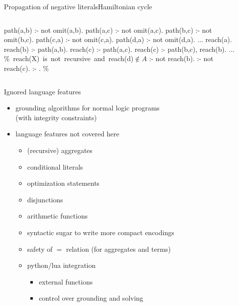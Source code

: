 \begin{frame}{Propagation of negative literals}{Hamiltonian cycle}
  \begin{columns}
    \begin{column}{0.45\textwidth}
    \begin{minipage}{.4\textwidth}\small
      \begin{semiverbatim}
path(a,b) :- not omit(a,b).
path(a,c) :- not omit(a,c).
path(b,c) :- not omit(b,c).
path(c,a) :- not omit(c,a).
path(d,a) :- not omit(d,a).
...
\alert{reach(a)}.
\alert{reach(b)} :- path(a,b).
\alert{reach(c)} :- path(a,c).
\alert{reach(c)} :- path(b,c), reach(b).
...
\mbox{{\color{comment}\% reach(X) is not recursive and reach(d)\({}\not\in{}A\)}}
:- not reach(b).
:- not reach(c).
:- . \color{comment}\% 
      \end{semiverbatim}
    \end{minipage}
    \end{column}
    \begin{column}[t]{0.45\textwidth}
      \centering
      \Graph[draw=none]
    \end{column}
  \end{columns}
\end{frame}
\begin{frame}{Ignored language features}
  \bigskip
  \begin{itemize}
    \item grounding algorithms for normal logic programs\\(with integrity constraints)
    \item language features not covered here
      \begin{itemize}
        \item (recursive) aggregates
        \item conditional literals
        \item optimization statements
        \item disjunctions
        \item arithmetic functions
        \item syntactic sugar to write more compact encodings
        \item safety of \(=\) relation (for aggregates and terms)
        \item python/lua integration
          \begin{itemize}
            \item external functions
            \item control over grounding and solving
          \end{itemize}
      \end{itemize}
  \end{itemize}
\end{frame}
%
